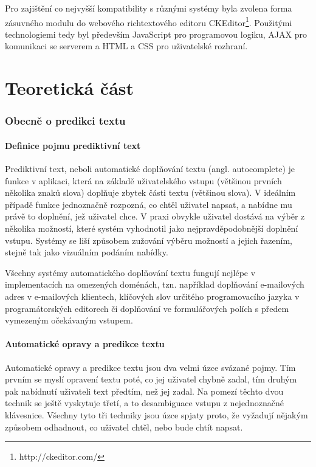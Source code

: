 \documentclass[a4paper,11pt]{article}
\begin{document}
Pro zajištění co nejvyšší kompatibility s různými systémy byla zvolena forma zásuvného modulu do webového richtextového editoru CKEditor\footnote{http://ckeditor.com/}. Použitými technologiemi tedy byl především JavaScript pro programovou logiku, AJAX pro komunikaci se serverem a HTML a CSS pro uživatelské rozhraní.

\newpage

\part{Teoretická část}

\section{Obecně o predikci textu}

\subsection{Definice pojmu prediktivní text}

Prediktivní text, neboli automatické doplňování textu (angl. autocomplete) je funkce v aplikaci, která na základě uživatelského vstupu (většinou prvních několika znaků slova) doplňuje zbytek části textu (většinou slova). V ideálním případě funkce jednoznačně rozpozná, co chtěl uživatel napsat, a nabídne mu právě to doplnění, jež uživatel chce. V praxi obvykle uživatel dostává na výběr z několika možností, které systém vyhodnotil jako nejpravděpodobnější doplnění vstupu. Systémy se liší způsobem zužování výběru možností a jejich řazením, stejně tak jako vizuálním podáním nabídky.

Všechny systémy automatického doplňování textu fungují nejlépe v implementacích na omezených doménách, tzn. například doplňování e-mailových adres v e-mailových klientech, klíčových slov určitého programovacího jazyka v programátorských editorech či doplňování ve formulářových polích s předem vymezeným očekávaným vstupem. 

\subsection{Automatické opravy a predikce textu}

Automatické opravy a predikce textu jsou dva velmi úzce svázané pojmy. Tím prvním se myslí opravení textu poté, co jej uživatel chybně zadal, tím druhým pak nabídnutí uživateli text předtím, než jej zadal. Na pomezí těchto dvou technik se ještě vyskytuje třetí, a to desambiguace vstupu z nejednoznačné klávesnice. Všechny tyto tři techniky jsou úzce spjaty proto, že vyžadují nějakým způsobem odhadnout, co uživatel chtěl, nebo bude chtít napsat.
\end{document}
